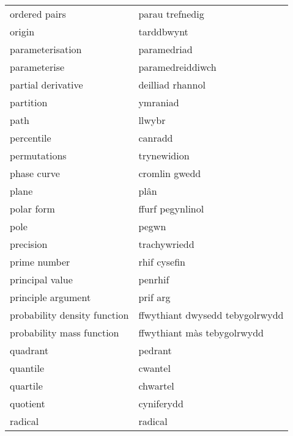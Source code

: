 \begin{supertabular}{p{0.22\textwidth}p{0.22\textwidth}}
                    ordered pairs &                  parau trefnedig \\
                           origin &                       tarddbwynt \\
                 parameterisation &                      paramedriad \\
                     parameterise &                 paramedreiddiwch \\
               partial derivative &                 deilliad rhannol \\
                        partition &                         ymraniad \\
                             path &                           llwybr \\
                       percentile &                          canradd \\
                     permutations &                      trynewidion \\
                      phase curve &                    cromlin gwedd \\
                            plane &                             plân \\
                       polar form &                 ffurf pegynlinol \\
                             pole &                            pegwn \\
                        precision &                     trachywriedd \\
                     prime number &                     rhif cysefin \\
                  principal value &                          penrhif \\
               principle argument &                         prif arg \\
     probability density function &  ffwythiant dwysedd tebygolrwydd \\
        probability mass function &      ffwythiant màs tebygolrwydd \\
                         quadrant &                          pedrant \\
                         quantile &                          cwantel \\
                         quartile &                         chwartel \\
                         quotient &                       cyniferydd \\
                          radical &                          radical \\

\end{supertabular}
